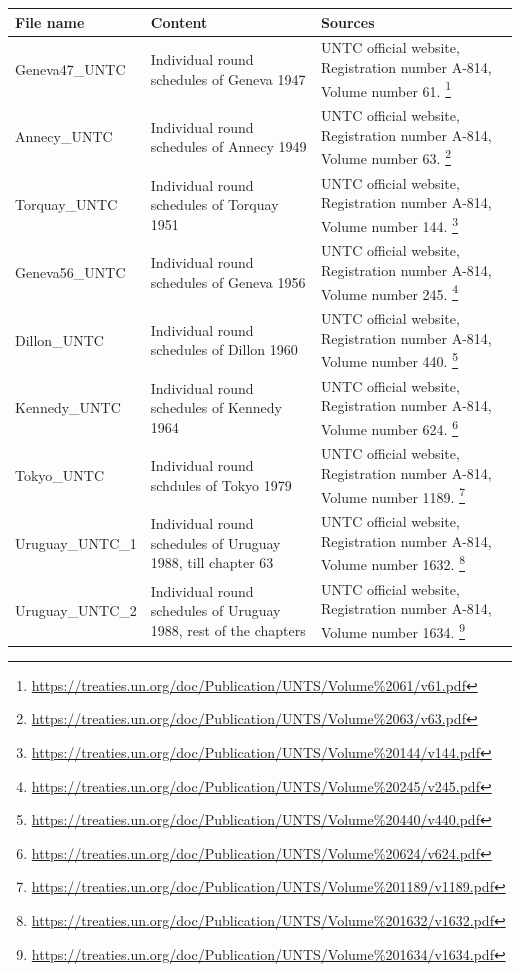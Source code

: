 \documentclass[
  12pt,
]{article}
\begin{document}
\begin{longtable}[]{@{}
  >{\raggedright\arraybackslash}p{}
  >{\raggedright\arraybackslash}p{}
  >{\raggedright\arraybackslash}p{}@{}}
\toprule
File name & Content & Sources \\
\midrule
\endhead
Geneva47\_UNTC & Individual round schedules of Geneva 1947 & UNTC official website, Registration number A-814, Volume number 61. \footnote{\url{https://treaties.un.org/doc/Publication/UNTS/Volume\%2061/v61.pdf}} \\
Annecy\_UNTC & Individual round schedules of Annecy 1949 & UNTC official website, Registration number A-814, Volume number 63. \footnote{\url{https://treaties.un.org/doc/Publication/UNTS/Volume\%2063/v63.pdf}} \\
Torquay\_UNTC & Individual round schedules of Torquay 1951 & UNTC official website, Registration number A-814, Volume number 144. \footnote{\url{https://treaties.un.org/doc/Publication/UNTS/Volume\%20144/v144.pdf}} \\
Geneva56\_UNTC & Individual round schedules of Geneva 1956 & UNTC official website, Registration number A-814, Volume number 245. \footnote{\url{https://treaties.un.org/doc/Publication/UNTS/Volume\%20245/v245.pdf}} \\
Dillon\_UNTC & Individual round schedules of Dillon 1960 & UNTC official website, Registration number A-814, Volume number 440. \footnote{\url{https://treaties.un.org/doc/Publication/UNTS/Volume\%20440/v440.pdf}} \\
Kennedy\_UNTC & Individual round schedules of Kennedy 1964 & UNTC official website, Registration number A-814, Volume number 624. \footnote{\url{https://treaties.un.org/doc/Publication/UNTS/Volume\%20624/v624.pdf}} \\
Tokyo\_UNTC & Individual round schdules of Tokyo 1979 & UNTC official website, Registration number A-814, Volume number 1189. \footnote{\url{https://treaties.un.org/doc/Publication/UNTS/Volume\%201189/v1189.pdf}} \\
Uruguay\_UNTC\_1 & Individual round schedules of Uruguay 1988, till chapter 63 & UNTC official website, Registration number A-814, Volume number 1632. \footnote{\url{https://treaties.un.org/doc/Publication/UNTS/Volume\%201632/v1632.pdf}} \\
Uruguay\_UNTC\_2 & Individual round schedules of Uruguay 1988, rest of the chapters & UNTC official website, Registration number A-814, Volume number 1634. \footnote{\url{https://treaties.un.org/doc/Publication/UNTS/Volume\%201634/v1634.pdf}} \\

\end{longtable}
\end{document}
